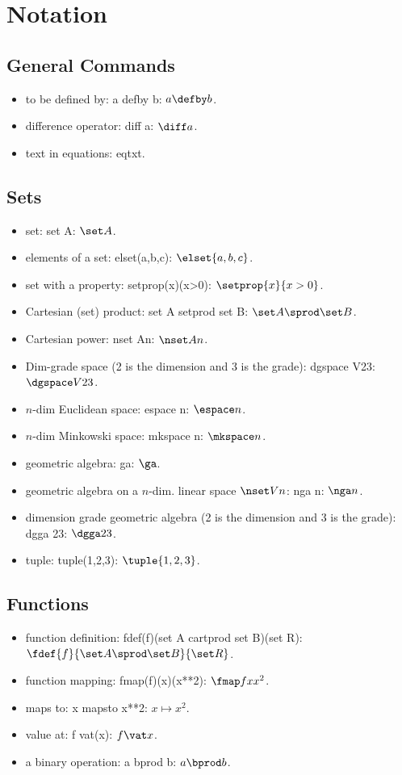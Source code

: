 \section{Notation}

\begin{multicols}{2}
\subsection{General Commands}
\begin{itemize}
\item to be defined by: a defby b: $a\defby b$.
\item difference operator: diff a: $\diff a$.
\item text in equations: eqtxt.
\end{itemize}


\subsection{Sets}
\begin{itemize}
\item set: set A: $\set A$.
\item elements of a set: elset(a,b,c): $\elset{a,b,c}$.
\item set with a property: setprop(x)(x>0): $\setprop{x}{x>0}$.
\item Cartesian (set) product: set A setprod set B: $\set A\sprod\set B$.
\item Cartesian power: nset An: $\nset An$.
\item Dim-grade space (2 is the dimension and 3 is the grade): dgspace V23: $\dgspace V23$.
\item $n$-dim Euclidean space: espace n: $\espace n$.
\item $n$-dim Minkowski space: mkspace n: $\mkspace n$.
\item geometric algebra: ga: $\ga$.
\item geometric algebra on a $n$-dim. linear space $\nset Vn$: nga n: $\nga n$.
\item dimension grade geometric algebra (2 is the dimension and 3 is the grade): dgga 23: $\dgga 23$.
\item tuple: tuple(1,2,3): $\tuple{1,2,3}$.
\end{itemize}


\subsection{Functions}
\begin{itemize}
\item function definition: fdef(f)(set A cartprod set B)(set R): $\fdef{f}{\set A\sprod\set B}{\set R}$.
\item function mapping: fmap(f)(x)(x**2): $\fmap f x{x^2}$.
\item maps to: x mapsto x**2: $x\mapsto x^2$.
\item value at: f vat(x): $f\vat x$.
\item a binary operation: a bprod b: $a\bprod b$.
\end{itemize}



\end{multicols}
